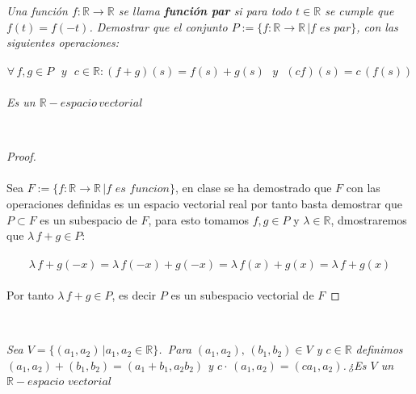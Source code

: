 \documentclass[11pt,letterpaper]{article}
\newcommand{\R}{\mathbb{R}}
\begin{document}
\begin{tcolorbox}[
	title = \textcolor{black}{\textcolor{white}{Problema 6}},]
\textit{Una funci\'on $f:\mathbb{R}\rightarrow \mathbb{R}$ se llama \textbf{funci\'on par} si para todo $t\in \mathbb{R}$ se cumple que
$f(t)=f(-t)$. Demostrar que el conjunto $P:=\{f:\mathbb{R}\rightarrow\mathbb{R}\,| f\,\,es \,\,par\}$, con las siguientes operaciones:\,\\
\,\\
\begin{equation*}
    \forall\,f,g \in P\,\,\,\,y\,\,\,\,c\in \mathbb{R}:(f+g)(s)=f(s)+g(s)\,\,\,\,y\,\,\,\,(cf)(s)=c\,(f(s))
\end{equation*}\,\\
Es un $\mathbb{R}-espacio\,vectorial$ 
}
\end{tcolorbox}\,\\
\begin{proof}\,\\
	\,\\
	Sea $F:=\{f:\R\rightarrow \R\,|f\,\,es\,\,funcion\}$, en clase se ha demostrado que $F$ con las operaciones definidas es un espacio vectorial real
	por tanto basta demostrar que $P\subset F$ es un subespacio de $F$, para esto tomamos $f,g\in P$ y $\lambda\in \R$, dmostraremos que $\lambda\,f+g\in P$:\,\\
	\,\\
	\begin{equation*}
		\lambda\,f+g(-x)=\lambda\,f(-x)+g(-x)=\lambda\,f(x)+g(x)=\lambda\,f+g(x)
	\end{equation*}\,\\
Por tanto $\lambda\,f+g\in P$, es decir $P$ es un subespacio vectorial de $F$
\end{proof}
\,\\
\begin{tcolorbox}[
	title = \textcolor{black}{\textcolor{white}{Problema 7}},]
\textit{Sea $V=\{(a_1,a_2)\,|a_1,a_2\in \mathbb{R}\}$. \,Para $(a_1,a_2),\,(b_1,b_2)\in V$ y $c\in \mathbb{R}$
definimos\\$(a_1,a_2)+(b_1,b_2)=(a_1+b_1,a_2b_2)$ y $c\cdot\,(a_1,a_2)=(ca_1,a_2)$.\,¿Es $V$ un $\mathbb{R}-espacio\,\,vectorial$
}
\end{tcolorbox}\,\\
\end{document}
